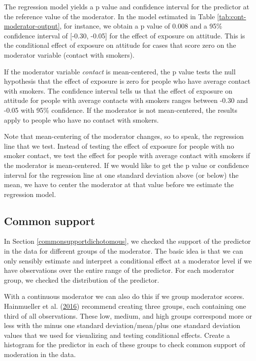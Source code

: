 \documentclass[a4paper]{book}
\theoremstyle{definition}
\theoremstyle{definition}
\theoremstyle{definition}
\theoremstyle{remark}
\begin{document}
The regression model yields a p value and confidence interval for the
predictor at the reference value of the moderator. In the model
estimated in Table \ref{tab:cont-moderator-output}, for instance, we
obtain a p value of 0.008 and a 95\% confidence interval of {[}-0.30,
-0.05{]} for the effect of exposure on attitude. This is the conditional
effect of exposure on attitude for cases that score zero on the
moderator variable (contact with smokers).

If the moderator variable \emph{contact} is mean-centered, the p value
tests the null hypothesis that the effect of exposure is zero for people
who have average contact with smokers. The confidence interval tells us
that the effect of exposure on attitude for people with average contacts
with smokers ranges between -0.30 and -0.05 with 95\% confidence. If the
moderator is not mean-centered, the results apply to people who have no
contact with smokers.

Note that mean-centering of the moderator changes, so to speak, the
regression line that we test. Instead of testing the effect of exposure
for people with no smoker contact, we test the effect for people with
average contact with smokers if the moderator is mean-centered. If we
would like to get the p value or confidence interval for the regression
line at one standard deviation above (or below) the mean, we have to
center the moderator at that value before we estimate the regression
model.

\subsection{Common support}\label{common-support}

In Section \ref{commonsupportdichotomous}, we checked the support of the
predictor in the data for different groups of the moderator. The basic
idea is that we can only sensibly estimate and interpret a conditional
effect at a moderator level if we have observations over the entire
range of the predictor. For each moderator group, we checked the
distribution of the predictor.

With a continuous moderator we can also do this if we group moderator
scores. Hainmueller et al. (\protect\hyperlink{ref-RefWorks:3838}{2016})
recommend creating three groups, each containing one third of all
observations. These low, medium, and high groups correspond more or less
with the minus one standard deviation/mean/plus one standard deviation
values that we used for visualizing and testing conditional effects.
Create a histogram for the predictor in each of these groups to check
common support of moderation in the data.
\end{document}
